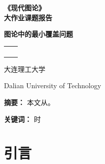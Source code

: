 \documentclass[10pt]{ctexart}
\begin{document}
\begin{titlepage}
	\vspace*{-2cm}
	\flushleft
	\vspace{3.5cm}
	\begin{center}
		\textbf{\song\yihao 《现代图论》\\[15pt] 大作业课题报告}
	\end{center}
	\vspace{3cm}
	\begin{center}
		\erhao \stxihei \parbox[t]{10em}
		{ \textbf{图论中的最小覆盖问题} }
	\end{center}
	\vspace{2cm}
	\begin{center}
		\song{}
		\renewcommand\arraystretch{1.5}
		\begin{tabular}{p{2.5cm}c}
			\makebox[6em][s]{学生姓名：}  & \underline{\makebox[15em][c]{X}}      \\
			\makebox[6em][s]{学科、专业：} & \underline{\makebox[15em][c]{应用数学}}   \\
			\makebox[6em][s]{学号：}    & \underline{\makebox[15em][c]{x}}      \\
			\makebox[6em][s]{完成日期：}  & \underline{\makebox[15em][c]{\today}} \\
		\end{tabular}
		
		\vspace{3cm}
		{\hwxk \xiaoerhao 大连理工大学}
		
		\vspace*{5pt}
		{ Dalian University of Technology}
	\end{center}
\end{titlepage}





\xiaosihao
\tableofcontents%
\thispagestyle{empty}
\clearpage

\setcounter{page}{1}


\newpage


\textbf{\heiti 摘要：} 本文从。


\textbf{\heiti 关键词：} 时

\section{引言}
\end{document}
